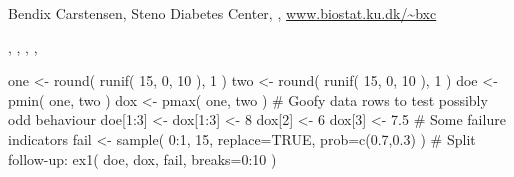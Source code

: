 \begin{Author}\relax
Bendix Carstensen, Steno Diabetes Center,
, \url{www.biostat.ku.dk/~bxc}
\end{Author}
\begin{SeeAlso}\relax
{},
,
,
,
\end{SeeAlso}
\begin{Examples}
\begin{ExampleCode}
one <- round( runif( 15, 0, 10 ), 1 )
two <- round( runif( 15, 0, 10 ), 1 )
doe <- pmin( one, two )
dox <- pmax( one, two )
# Goofy data rows to test possibly odd behaviour
doe[1:3] <- dox[1:3] <- 8
dox[2] <- 6
dox[3] <- 7.5
# Some failure indicators
fail <- sample( 0:1, 15, replace=TRUE, prob=c(0.7,0.3) )
# Split follow-up:
ex1( doe, dox, fail, breaks=0:10 )
\end{ExampleCode}
\end{Examples}

